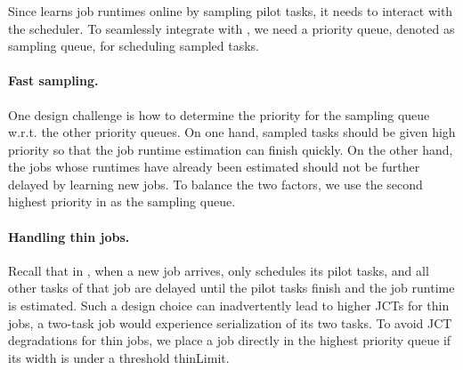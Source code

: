 
\subsubsection{\slearn}
\label{sec:design:namepredict}

\rm{Since \slearn learns job runtimes online by sampling pilot tasks, it
needs to interact with the scheduler.}
To seamlessly integrate \slearn
with \gs, we need a priority queue, denoted as sampling queue, for scheduling
sampled tasks.


\paragraph{Fast sampling.}
One design challenge is how to determine the priority for the sampling queue
w.r.t. the other priority queues.
On one hand, sampled tasks should be given high priority so that the job
runtime estimation can finish quickly. On the other hand, the jobs whose
runtimes have already been estimated should not be further delayed by learning
new jobs. To balance the two factors, we use the second
highest priority in \gs as the sampling queue.

\paragraph{Handling thin jobs.}
Recall that in \name, when a new job arrives, \name only schedules its pilot
tasks, and all other tasks of that job are delayed until the pilot tasks finish
and the job runtime is estimated. Such a design choice can inadvertently lead
to higher JCTs for thin jobs, \eg a two-task job would experience serialization
of its two tasks. To avoid JCT degradations for thin jobs, we place a job
directly in the highest priority queue if its width is under a threshold thinLimit.

